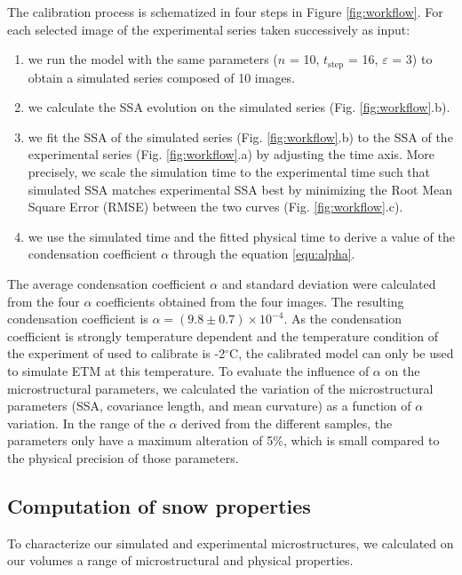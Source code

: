 \documentclass[draft,ms]{agujournal2019}
\begin{document}
The calibration process is schematized in four steps in Figure \ref{fig:workflow}. For each selected image of the experimental series taken successively as input:
\begin{enumerate}
    \item we run the model with the same parameters ($n$ = 10, $t_{\mathrm{step}}$ = 16, $\varepsilon$ = 3) to obtain a simulated series composed of 10 images. 
    \item we calculate the SSA evolution on the simulated series (Fig. \ref{fig:workflow}.b).
    \item we fit the SSA of the simulated series (Fig. \ref{fig:workflow}.b) to the SSA of the experimental series (Fig. \ref{fig:workflow}.a) by adjusting the time axis. More precisely, we scale the simulation time to the experimental time such that simulated SSA matches experimental SSA best by minimizing the Root Mean Square Error (RMSE) between the two curves (Fig. \ref{fig:workflow}.c).   
    \item we use the simulated time and the fitted physical time to derive a value of the condensation coefficient $\alpha$ through the equation \eqref{equ:alpha}. 
\end{enumerate}

The average condensation coefficient $\alpha$ and standard deviation were calculated from the four $\alpha$ coefficients obtained from the four images. The resulting condensation coefficient is $\alpha = ( 9.8 \pm 0.7)\times 10^{-4}$. As the condensation coefficient is strongly temperature dependent and the temperature condition of the experiment of  used to calibrate is -2$^\circ$C, the calibrated model can only be used to simulate ETM at this temperature. To evaluate the influence of $\alpha$ on the microstructural parameters, we calculated the variation of the microstructural parameters (SSA, covariance length, and mean curvature) as a function of $\alpha$ variation. In the range of the $\alpha$ derived from the different samples, the parameters only have a maximum alteration of 5\%, which is small compared to the physical precision of those parameters. 

\subsection{Computation of snow properties}
\label{subsec:methode_physical_appli}

To characterize our simulated and experimental microstructures, we calculated on our volumes a range of microstructural and physical properties.
\end{document}
